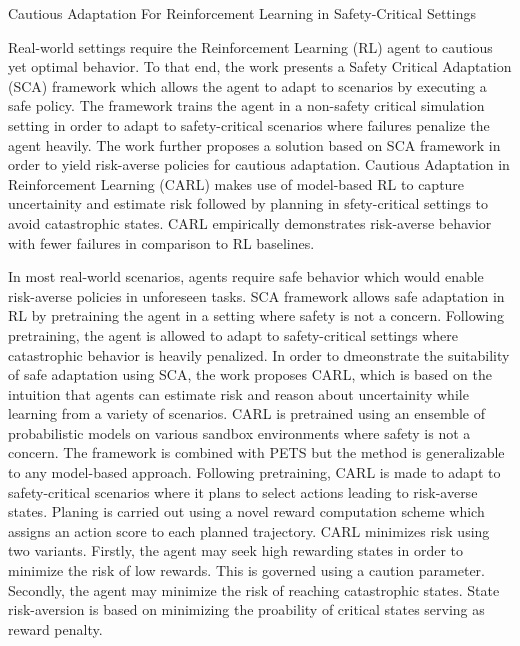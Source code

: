 \documentclass[11pt,letterpaper]{article}
\begin{document}
\begin{center}
  \large{Cautious Adaptation For Reinforcement Learning in Safety-Critical Settings}
\end{center}

Real-world settings require the Reinforcement Learning (RL) agent to cautious yet optimal behavior. To that end, the work presents a Safety Critical Adaptation (SCA) framework which allows the agent to adapt to scenarios by executing a safe policy. The framework trains the agent in a non-safety critical simulation setting in order to adapt to safety-critical scenarios where failures penalize the agent heavily. The work further proposes a solution based on SCA framework in order to yield risk-averse policies for cautious adaptation. Cautious Adaptation in Reinforcement Learning (CARL) makes use of model-based RL to capture uncertainity and estimate risk followed by planning in sfety-critical settings to avoid catastrophic states. CARL empirically demonstrates risk-averse behavior with fewer failures in comparison to RL baselines. 

In most real-world scenarios, agents require safe behavior which would enable risk-averse policies in unforeseen tasks. SCA framework allows safe adaptation in RL by pretraining the agent in a setting where safety is not a concern. Following pretraining, the agent is allowed to adapt to safety-critical settings where catastrophic behavior is heavily penalized. In order to dmeonstrate the suitability of safe adaptation using SCA, the work proposes CARL, which is based on the intuition that agents can estimate risk and reason about uncertainity while learning from a variety of scenarios. CARL is pretrained using an ensemble of probabilistic models on various sandbox environments where safety is not a concern. The framework is combined with PETS but the method is generalizable to any model-based approach. Following pretraining, CARL is made to adapt to safety-critical scenarios where it plans to select actions leading to risk-averse states. Planing is carried out using a novel reward computation scheme which assigns an action score to each planned trajectory. CARL minimizes risk using two variants. Firstly, the agent may seek high rewarding states in order to minimize the risk of low rewards. This is governed using a caution parameter. Secondly, the agent may minimize the risk of reaching catastrophic states. State risk-aversion is based on minimizing the proability of critical states serving as reward penalty. 
\end{document}
